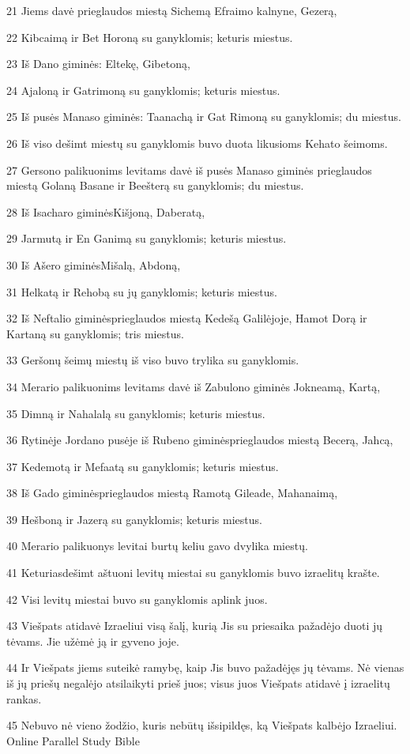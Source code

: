 \par 21 Jiems davė prieglaudos miestą Sichemą Efraimo kalnyne, Gezerą, 
\par 22 Kibcaimą ir Bet Horoną su ganyklomis; keturis miestus. 
\par 23 Iš Dano giminės: Eltekę, Gibetoną, 
\par 24 Ajaloną ir Gatrimoną su ganyklomis; keturis miestus. 
\par 25 Iš pusės Manaso giminės: Taanachą ir Gat Rimoną su ganyklomis; du miestus. 
\par 26 Iš viso dešimt miestų su ganyklomis buvo duota likusioms Kehato šeimoms. 
\par 27 Gersono palikuonims levitams davė iš pusės Manaso giminės prieglaudos miestą Golaną Basane ir Beešterą su ganyklomis; du miestus. 
\par 28 Iš Isacharo giminės­Kišjoną, Daberatą, 
\par 29 Jarmutą ir En Ganimą su ganyklomis; keturis miestus. 
\par 30 Iš Ašero giminės­Mišalą, Abdoną, 
\par 31 Helkatą ir Rehobą su jų ganyklomis; keturis miestus. 
\par 32 Iš Neftalio giminės­prieglaudos miestą Kedešą Galilėjoje, Hamot Dorą ir Kartaną su ganyklomis; tris miestus. 
\par 33 Geršonų šeimų miestų iš viso buvo trylika su ganyklomis. 
\par 34 Merario palikuonims levitams davė iš Zabulono giminės Jokneamą, Kartą, 
\par 35 Dimną ir Nahalalą su ganyklomis; keturis miestus. 
\par 36 Rytinėje Jordano pusėje iš Rubeno giminės­prieglaudos miestą Becerą, Jahcą, 
\par 37 Kedemotą ir Mefaatą su ganyklomis; keturis miestus. 
\par 38 Iš Gado giminės­prieglaudos miestą Ramotą Gileade, Mahanaimą, 
\par 39 Hešboną ir Jazerą su ganyklomis; keturis miestus. 
\par 40 Merario palikuonys levitai burtų keliu gavo dvylika miestų. 
\par 41 Keturiasdešimt aštuoni levitų miestai su ganyklomis buvo izraelitų krašte. 
\par 42 Visi levitų miestai buvo su ganyklomis aplink juos. 
\par 43 Viešpats atidavė Izraeliui visą šalį, kurią Jis su priesaika pažadėjo duoti jų tėvams. Jie užėmė ją ir gyveno joje. 
\par 44 Ir Viešpats jiems suteikė ramybę, kaip Jis buvo pažadėjęs jų tėvams. Nė vienas iš jų priešų negalėjo atsilaikyti prieš juos; visus juos Viešpats atidavė į izraelitų rankas. 
\par 45 Nebuvo nė vieno žodžio, kuris nebūtų išsipildęs, ką Viešpats kalbėjo Izraeliui.
Online Parallel Study Bible



